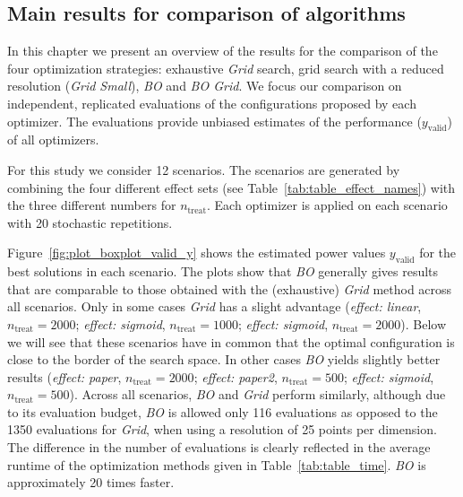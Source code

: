 \documentclass[bimj,fleqn]{w-art}
\theoremstyle{plain}
\theoremstyle{definition}
\begin{document}
\subsection{Main results for comparison of algorithms}

In this chapter we present an overview of the results for the comparison of the four optimization strategies: exhaustive \emph{Grid} search, grid search with a reduced resolution (\emph{Grid Small}), \emph{BO} and \emph{BO Grid}.
We focus our comparison on independent, replicated evaluations of the configurations proposed by each optimizer.
The evaluations provide unbiased estimates of the performance ($y_{\text{valid}}$) of all optimizers.

For this study we consider 12 scenarios.
The scenarios are generated by combining the four different effect sets (see Table~\ref{tab:table_effect_names}) with the three different numbers for $n_{\text{treat}}$.
Each optimizer is applied on each scenario with 20 stochastic repetitions.

Figure~\ref{fig:plot_boxplot_valid_y} shows the estimated power values $y_{\text{valid}}$ for the best solutions in each scenario.
The plots show that \emph{BO} generally gives results that are comparable to those obtained with the (exhaustive) \emph{Grid} method across all scenarios. 
Only in some cases \emph{Grid} has a slight advantage (\emph{effect: linear}, $n_{\text{treat}} = 2000$; \emph{effect: sigmoid}, $n_{\text{treat}} = 1000$; \emph{effect: sigmoid}, $n_{\text{treat}} = 2000$).
Below we will see that these scenarios have in common that the optimal configuration is close to the border of the search space. 
In other cases \emph{BO} yields slightly better results (\emph{effect: paper}, $n_{\text{treat}} = 2000$; \emph{effect: paper2}, $n_{\text{treat}} = 500$; \emph{effect: sigmoid}, $n_{\text{treat}} = 500$).
Across all scenarios, \emph{BO} and \emph{Grid} perform similarly, although due to its evaluation budget, \emph{BO} is allowed only 116 evaluations as opposed to the 1350 evaluations for \emph{Grid}, when using a resolution of 25 points per dimension.
The difference in the number of evaluations is clearly reflected in the average runtime of the optimization methods given in Table~\ref{tab:table_time}.
\emph{BO} is approximately 20 times faster.

\end{document}
